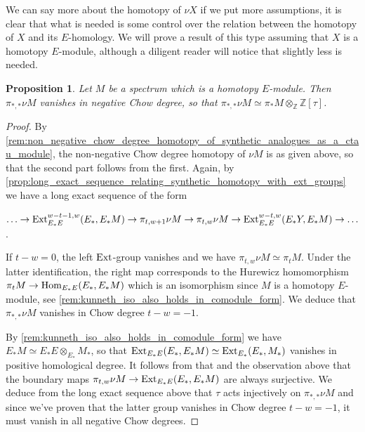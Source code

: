 \documentclass[oneside,a4paper]{amsart}
\theoremstyle{plain}
\newtheorem{prop}[thm]{Proposition}
\theoremstyle{definition}
\theoremstyle{remark}
\begin{document}
We can say more about the homotopy of $\nu X$ if we put more assumptions, it is clear that what is needed is some control over the relation between the homotopy of $X$ and its $E$-homology. We will prove a result of this type assuming that $X$ is a homotopy $E$-module, although a diligent reader will notice that slightly less is needed. 

\begin{prop}
\label{prop:homotopy_of_synthetic_analogues_of_homotopy_e_modules}
Let $M$ be a spectrum which is a homotopy $E$-module. Then $\pi_{*, *} \nu M$ vanishes in negative Chow degree, so that $\pi_{*, *} \nu M \simeq \pi_{*}M \otimes _{\mathbb{Z}} \mathbb{Z}[\tau]$. 
\end{prop}

\begin{proof}
By \cref{rem:non_negative_chow_degree_homotopy_of_synthetic_analogues_as_a_ctau_module}, the non-negative Chow degree homotopy of $\nu M$ is as given above, so that the second part follows from the first. Again, by \cref{prop:long_exact_sequence_relating_synthetic_homotopy_with_ext_groups} we have a long exact sequence of the form

\begin{center}
$\ldots \rightarrow \textnormal{Ext}_{E_{*}E}^{w-t-1, w}(E_{*}, E_{*}M) \rightarrow \pi_{t, w+1} \nu M \rightarrow \pi_{t, w} \nu M \rightarrow \textnormal{Ext}^{w-t, w}_{E_{*}E}(E_{*}Y, E_{*}M) \rightarrow \ldots$.
\end{center}
If $t - w = 0$, the left $\textnormal{Ext}$-group vanishes and we have $\pi_{t, w} \nu M \simeq \pi_{t} M$. Under the latter identification, the right map corresponds to the Hurewicz homomorphism $\pi_{t} M \rightarrow \textnormal{Hom}_{E_{*}E}(E_{*}, E_{*}M)$ which is an isomorphism since $M$ is a homotopy $E$-module, see \cref{rem:kunneth_iso_also_holds_in_comodule_form}. We deduce that $\pi_{*, *} \nu M$ vanishes in Chow degree $t-w = -1$. 

By \cref{rem:kunneth_iso_also_holds_in_comodule_form} we have $E_{*}M \simeq E_{*}E \otimes _{E_{*}} M_{*}$, so that $\textnormal{Ext}_{E_{*}E}(E_{*}, E_{*}M) \simeq \textnormal{Ext}_{E_{*}}(E_{*}, M_{*})$ vanishes in positive homological degree. It follows from that and the observation above that the boundary maps $\pi_{t, w} \nu M \rightarrow \textnormal{Ext}_{E_{*}E}(E_{*}, E_{*}M)$ are always surjective. We deduce from the long exact sequence above that $\tau$ acts injectively on $\pi_{*, *} \nu M$ and since we've proven that the latter group vanishes in Chow degree $t - w = -1$, it must vanish in all negative Chow degrees.
\end{proof}
\end{document}
